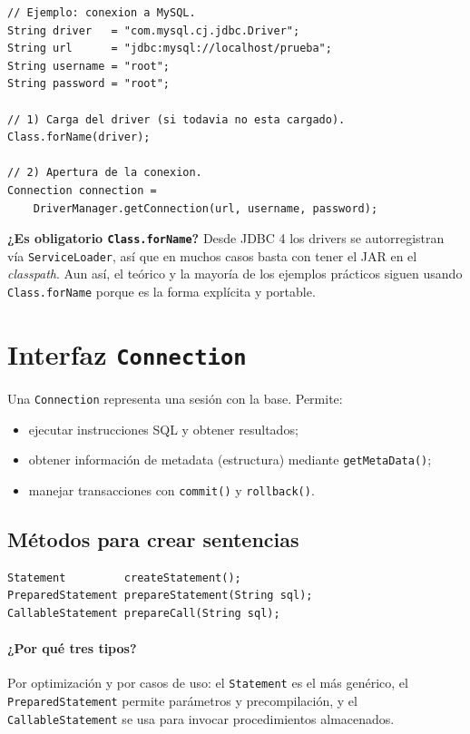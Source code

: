 \documentclass[11pt,a4paper]{article}
\begin{document}
\begin{lstlisting}
// Ejemplo: conexion a MySQL.
String driver   = "com.mysql.cj.jdbc.Driver";
String url      = "jdbc:mysql://localhost/prueba";
String username = "root";
String password = "root";

// 1) Carga del driver (si todavia no esta cargado).
Class.forName(driver);

// 2) Apertura de la conexion.
Connection connection =
    DriverManager.getConnection(url, username, password);
\end{lstlisting}

\begin{nota}
\textbf{¿Es obligatorio \texttt{Class.forName}?} Desde JDBC 4 los
drivers se autorregistran vía \texttt{ServiceLoader}, así que en
muchos casos basta con tener el JAR en el \emph{classpath}. Aun así,
el teórico y la mayoría de los ejemplos prácticos siguen usando
\texttt{Class.forName} porque es la forma explícita y portable.
\end{nota}

\section{Interfaz \texttt{Connection}}

Una \texttt{Connection} representa una sesión con la base. Permite:

\begin{itemize}
    \item ejecutar instrucciones SQL y obtener resultados;
    \item obtener información de metadata (estructura) mediante
    \texttt{getMetaData()};
    \item manejar transacciones con \texttt{commit()} y
    \texttt{rollback()}.
\end{itemize}

\subsection*{Métodos para crear sentencias}

\begin{lstlisting}
Statement         createStatement();
PreparedStatement prepareStatement(String sql);
CallableStatement prepareCall(String sql);
\end{lstlisting}

\paragraph{¿Por qué tres tipos?} Por optimización y por casos de
uso: el \texttt{Statement} es el más genérico, el
\texttt{PreparedStatement} permite parámetros y precompilación, y el
\texttt{CallableStatement} se usa para invocar procedimientos
almacenados.
\end{document}
